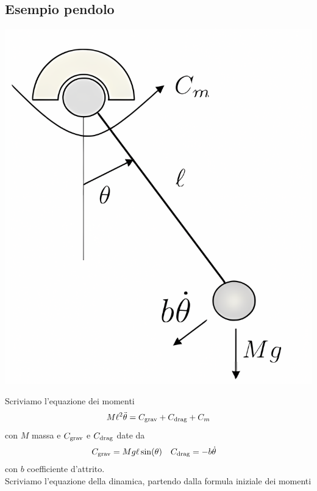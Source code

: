 \documentclass{article}
\begin{document}
\subsection{Esempio pendolo}
\begin{center}
    \includegraphics[scale=0.17]{Images/Es_pendolo.png}
\end{center}
Scriviamo l'equazione dei momenti
\[
    M \ell^2 \ddot \theta= C_{\text{grav}} + C_{\text{drag}} + C_m
\]
con $M$ massa e $C_{\text{grav}}$ e $C_{\text{drag}}$ date da
\begin{align*}
    C_{\text{grav}} &=M g \ell \sin(\theta) &
    C_{\text{drag}} &= -b \dot \theta
\end{align*}
con $b$ coefficiente d'attrito.
\vspace*{0.2cm}\\
Scriviamo l'equazione della dinamica, partendo dalla formula iniziale dei momenti
\end{document}

